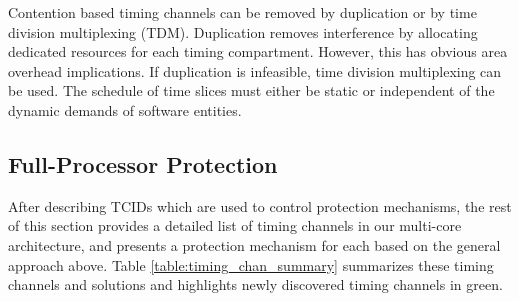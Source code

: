 Contention based timing channels can be removed by duplication or by
time division multiplexing (TDM). Duplication removes interference by
allocating dedicated resources for each timing compartment.
However, this has obvious area overhead implications. If duplication is 
infeasible, time division multiplexing can be used.
The schedule of time slices must either be static or independent of the dynamic 
demands of software entities.

%

\subsection{Full-Processor Protection}


After describing TCIDs which are used to control protection mechanisms,
the rest of this section provides a detailed list of timing channels in our  
multi-core architecture, and presents a protection mechanism for each 
based on the general approach above.
Table \ref{table:timing_chan_summary} summarizes these timing channels and
solutions and highlights newly discovered timing channels in green.

